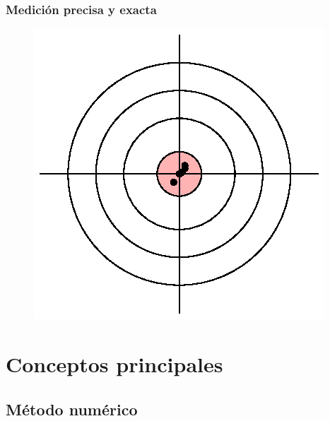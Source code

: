 \documentclass[12pt]{beamer}
\begin{document}
\begin{frame}
\frametitle{Medición precisa y exacta}
\begin{figure}
    \centering  
    \includegraphics[scale=1]{Imagenes/exactitud_precision_01.eps}
\end{figure}
\end{frame}

\section{Conceptos principales}
\subsection{Método numérico}
\end{document}
